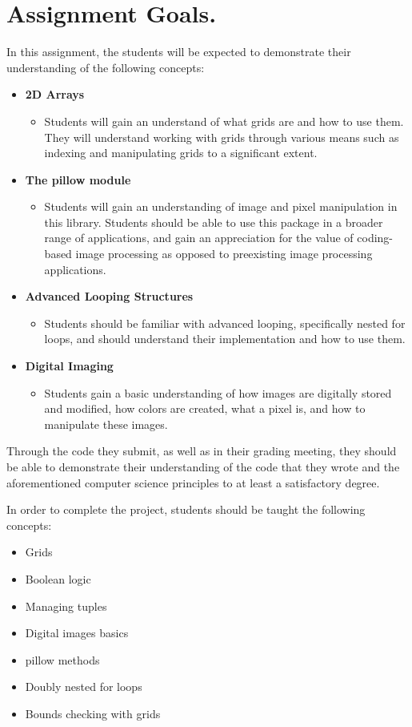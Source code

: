 \documentclass[11pt, letterpaper, onecolumn, oneside, final]{article}
\begin{document}
    \maketitle
\section{Assignment Goals.}
In this assignment, the students will be expected to demonstrate their understanding of the following concepts:
\begin{itemize}
\item \textbf{2D Arrays}
\begin{itemize}
    \item Students will gain an understand of what grids are and how to use them. They will understand working with grids through various means such as indexing and manipulating grids to a significant extent.
\end{itemize}

\item \textbf{The {\consolas pillow} module}
\begin{itemize}
    \item Students will gain an understanding of image and pixel manipulation in this library.
     Students should be able to use this package in a broader range of applications, and gain an appreciation for the value of coding-based image processing as opposed to preexisting image processing applications. 
\end{itemize}
\item \textbf{Advanced Looping Structures} 
\begin{itemize}
    \item Students should be familiar with advanced looping, specifically nested for loops, and should understand their implementation and how to use them.
\end{itemize}
\item \textbf{Digital Imaging}
\begin{itemize}
    \item Students gain a basic understanding of how images are digitally stored and modified, how colors are created, what a pixel is, and how to manipulate these images.
\end{itemize}
\end{itemize}
Through the code they submit, as well as in their grading meeting, they should be able to demonstrate their understanding of the code that they wrote and the aforementioned computer science principles to at least a satisfactory degree.

In order to complete the project, students should be taught the following concepts:
\begin{itemize}
    \item Grids
    \item Boolean logic
    \item Managing tuples
    \item Digital images basics \item {\consolas pillow} methods
    \item Doubly nested for loops
    \item Bounds checking with grids
\end{itemize}
\end{document}
